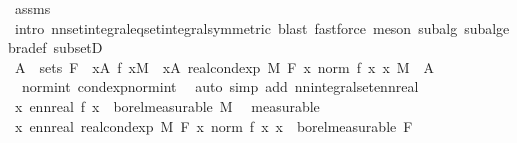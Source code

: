 \begin{isabellebody}
\ assms\ \isamarkupfalse%
\ {\isacharparenleft}{\kern0pt}intro\ nn{\isacharunderscore}{\kern0pt}set{\isacharunderscore}{\kern0pt}integral{\isacharunderscore}{\kern0pt}eq{\isacharunderscore}{\kern0pt}set{\isacharunderscore}{\kern0pt}integral{\isacharbrackleft}{\kern0pt}symmetric{\isacharbrackright}{\kern0pt}{\isacharcomma}{\kern0pt}\ blast{\isacharcomma}{\kern0pt}\ fastforce{\isacharparenright}{\kern0pt}\ {\isacharparenleft}{\kern0pt}meson\ subalg\ subalgebra{\isacharunderscore}{\kern0pt}def\ subsetD{\isacharparenright}{\kern0pt}\isanewline
\ \ \isanewline
\ \ \isamarkupfalse%
\ {\isachardoublequoteopen}A\ {\isasymin}\ sets\ F\ {\isasymLongrightarrow}\ {\isasymintegral}\isactrlsup {\isacharplus}{\kern0pt}x{\isasymin}A{\isachardot}{\kern0pt}\ {\isasymbar}f\ x{\isasymbar}{\isasympartial}M\ {\isacharequal}{\kern0pt}\ {\isasymintegral}\isactrlsup {\isacharplus}{\kern0pt}x{\isasymin}A{\isachardot}{\kern0pt}\ real{\isacharunderscore}{\kern0pt}cond{\isacharunderscore}{\kern0pt}exp\ M\ F\ {\isacharparenleft}{\kern0pt}{\isasymlambda}x{\isachardot}{\kern0pt}\ norm\ {\isacharparenleft}{\kern0pt}f\ x{\isacharparenright}{\kern0pt}{\isacharparenright}{\kern0pt}\ x\ {\isasympartial}M{\isachardoublequoteclose}\ \ A\ \isamarkupfalse%
\ {\isacharasterisk}{\kern0pt}{\isacharasterisk}{\kern0pt}\ norm{\isacharunderscore}{\kern0pt}int\ cond{\isacharunderscore}{\kern0pt}exp{\isacharunderscore}{\kern0pt}norm{\isacharunderscore}{\kern0pt}int\ \isamarkupfalse%
\ {\isacharparenleft}{\kern0pt}auto\ simp\ add{\isacharcolon}{\kern0pt}\ nn{\isacharunderscore}{\kern0pt}integral{\isacharunderscore}{\kern0pt}set{\isacharunderscore}{\kern0pt}ennreal{\isacharparenright}{\kern0pt}\isanewline
\ \ \isamarkupfalse%
\ \isamarkupfalse%
\ {\isachardoublequoteopen}{\isacharparenleft}{\kern0pt}{\isasymlambda}x{\isachardot}{\kern0pt}\ ennreal\ {\isasymbar}f\ x{\isasymbar}{\isacharparenright}{\kern0pt}\ {\isasymin}\ borel{\isacharunderscore}{\kern0pt}measurable\ M{\isachardoublequoteclose}\ \isamarkupfalse%
\ measurable\isanewline
\ \ \isamarkupfalse%
\ \isamarkupfalse%
\ {\isachardoublequoteopen}{\isacharparenleft}{\kern0pt}{\isasymlambda}x{\isachardot}{\kern0pt}\ ennreal\ {\isacharparenleft}{\kern0pt}real{\isacharunderscore}{\kern0pt}cond{\isacharunderscore}{\kern0pt}exp\ M\ F\ {\isacharparenleft}{\kern0pt}{\isasymlambda}x{\isachardot}{\kern0pt}\ norm\ {\isacharparenleft}{\kern0pt}f\ x{\isacharparenright}{\kern0pt}{\isacharparenright}{\kern0pt}\ x{\isacharparenright}{\kern0pt}{\isacharparenright}{\kern0pt}\ {\isasymin}\ borel{\isacharunderscore}{\kern0pt}measurable\ F{\isachardoublequoteclose}\ \isamarkupfalse%

\end{isabellebody}
